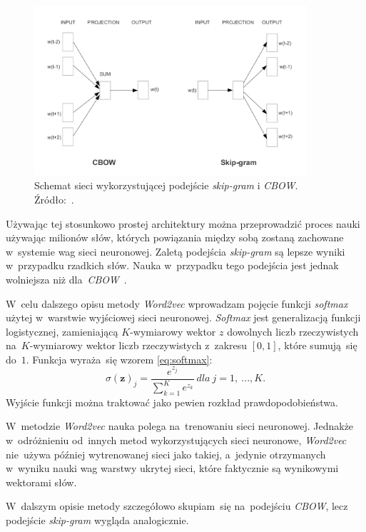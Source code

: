 \documentclass[pl]{minipw} %
\begin{document}
\begin{figure}[H]
	\centering
	\includegraphics[width=0.9\textwidth]{img/skipgram_cbow.png}
	\caption{Schemat sieci wykorzystującej podejście \textit{skip-gram} i \textit{CBOW}. Źródło:~\cite{word2vec}.}
\end{figure}
Używając tej stosunkowo prostej architektury można przeprowadzić proces nauki używając milionów słów, których powiązania między sobą zostaną zachowane w~systemie wag sieci neuronowej. Zaletą podejścia \textit{skip-gram} są lepsze wyniki w~przypadku rzadkich słów. Nauka w~przypadku tego podejścia jest jednak wolniejsza niż dla~\textit{CBOW}~\cite{google_word2vec}.

W~celu dalszego opisu metody \textit{Word2vec} wprowadzam pojęcie funkcji \textit{softmax} użytej w~warstwie wyjściowej sieci neuronowej. \textit{Softmax} jest generalizacją funkcji logistycznej, zamieniającą $K$-wymiarowy wektor $z$ dowolnych liczb rzeczywistych na~$K$-wymiarowy wektor liczb rzeczywistych z~zakresu $[0,1]$, które sumują~się do~$1$. Funkcja wyraża~się wzorem \ref{eq:softmax}:
\begin{equation}
\label{eq:softmax}
\sigma (\mathbf {z} )_{j}={\frac {e^{z_{j}}}{\sum _{k=1}^{K}e^{z_{k}}}}\ dla\ j=1,\ ...,K.
\end{equation}
Wyjście funkcji można traktować jako pewien rozkład prawdopodobieństwa.

W~metodzie \textit{Word2vec} nauka polega na~trenowaniu sieci neuronowej. Jednakże w~odróżnieniu od~innych metod wykorzystujących sieci neuronowe, \textit{Word2vec} nie~używa później wytrenowanej sieci jako takiej, a~jedynie otrzymanych w~wyniku nauki wag warstwy ukrytej sieci, które faktycznie są wynikowymi wektorami słów.

W~dalszym opisie metody szczegółowo skupiam~się na~podejściu \textit{CBOW}, lecz podejście \textit{skip-gram} wygląda analogicznie.
\end{document}
